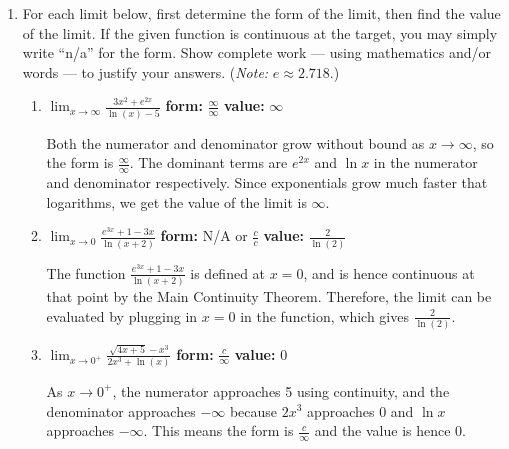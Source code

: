 \documentclass[11pt]{article}
\begin{document}
\begin{enumerate}

\item For each limit below, first determine the form of the limit, then find the value of the limit. 
If the given function is continuous at the target, you may simply write ``n/a'' for the form. 
Show complete work --- using mathematics and/or words --- to justify your answers. 
({\it Note:} $e \approx 2.718$.)


\begin{enumerate}
    \item[(a)] $\displaystyle\lim_{x\to\infty} \frac{3x^2 + e^{2x}}{\ln(x) - 5}$
    \hspace{1cm}
    \textbf{form:} {\color{blue} $\frac{\infty}{\infty}$ } \quad
    \textbf{value:} {\color{blue} $\infty$}
    \smallskip

    {\color{blue}
    Both the numerator and denominator grow without bound as $x \to \infty$, so the form is $\frac\infty\infty$. The dominant terms are $e^{2x}$ and $\ln x$ in the numerator and denominator respectively. Since exponentials grow much faster that logarithms, we get the value of the limit is $\infty$.
    }
\bigskip

    \item[(b)] 
    $\displaystyle\lim_{x\to0} \frac{e^{3x} + 1 - 3x}{\ln(x + 2)}$
    \hspace{1cm}
    \textbf{form:} {\color{blue} N/A or $\frac{c}{c}$} \quad
    \textbf{value:} {\color{blue} $\frac{2}{\ln(2)}$}
    \smallskip

    {\color{blue}
    The function $\frac{e^{3x} + 1 - 3x}{\ln(x + 2)}$ is defined at $x=0$, and is hence continuous at that point by the Main Continuity Theorem. Therefore, the limit can be evaluated by plugging in $x=0$ in the function, which gives $\frac{2}{\ln(2)}$.
    }
    \bigskip

    \item[(c)] 
    $\displaystyle\lim_{x\to 0^{+}} \frac{\sqrt{4x + 5} - x^3}{2x^3 + \ln(x)}$
    \hspace{1cm}
    \textbf{form:} {\color{blue} $\frac{c}{\infty}$} \quad
    \textbf{value:} {\color{blue} 0}
    \smallskip

    {\color{blue}
    As $x \to 0^+$, the numerator approaches 5 using continuity, and the denominator approaches $-\infty$ because $2x^3$ approaches 0 and $\ln x$ approaches $-\infty$. This means the form is $\frac{c}{\infty}$ and the value is hence 0.
    }
\end{enumerate}


\end{enumerate}
\end{document}
